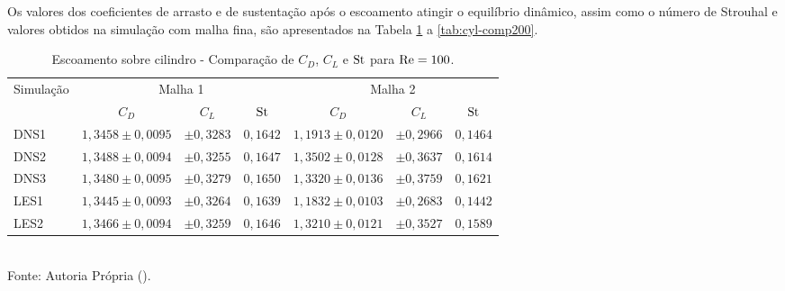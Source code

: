 Os valores dos coeficientes de arrasto e de sustentação após o escoamento atingir o equilíbrio dinâmico, assim como o número de Strouhal e valores obtidos na simulação com malha fina, são apresentados na Tabela \ref{tab:cyl-comp100} a \ref{tab:cyl-comp200}.

\begin{table}[h!]
    \centering
    \caption{Escoamento sobre cilindro - Comparação de $C_D$, $C_L$ e $\mathrm{St}$ para $\mathrm{Re}=100$.}
    \begin{tabular}{lcccccc}
        \hline
        \multirow{2}{*}{Simulação} & \multicolumn{3}{c}{Malha 1} & \multicolumn{3}{c}{Malha 2}                                                         \\\cline{2-7}
                                   & $C_D$                       & $C_L$                       & $\mathrm{St}$   & $C_D$             & $C_L$       & $\mathrm{St}$   \\\hline
        DNS1                       & $1,3458\pm0,0095$           & $\pm0,3283$                 & $0,1642$ & $1,1913\pm0,0120$ & $\pm0,2966$ & $0,1464$ \\
        DNS2                       & $1,3488\pm0,0094$           & $\pm0,3255$                 & $0,1647$ & $1,3502\pm0,0128$ & $\pm0,3637$ & $0,1614$ \\
        DNS3                       & $1,3480\pm0,0095$           & $\pm0,3279$                 & $0,1650$ & $1,3320\pm0,0136$ & $\pm0,3759$ & $0,1621$ \\
        LES1                       & $1,3445\pm0,0093$           & $\pm0,3264$                 & $0,1639$ & $1,1832\pm0,0103$ & $\pm0,2683$ & $0,1442$ \\
        LES2                       & $1,3466\pm0,0094$           & $\pm0,3259$                 & $0,1646$ & $1,3210\pm0,0121$ & $\pm0,3527$ & $0,1589$ \\\hline
    \end{tabular}
    \\Fonte: Autoria Própria (\the\year).
    \label{tab:cyl-comp100}
\end{table}

